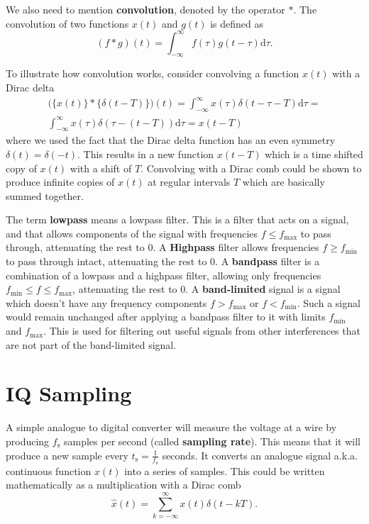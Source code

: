 \documentclass[a4paper,12pt,twoside,openright]{report}
\begin{document}
We also need to mention \textbf{convolution}, denoted by the operator $\ast$. The convolution of two functions $x(t)$ and $g(t)$ is defined as
$$(f \ast g)(t) = \int_{-\infty}^{\infty} f(\tau) g(t - \tau) \text{d} \tau .$$

To illustrate how convolution works, consider convolving a function $x(t)$ with a Dirac delta
\begin{multline}
\big( \{ x(t) \} \ast \{ \delta(t-T) \} \big)(t) =  \int_{-\infty}^{\infty} x(\tau) \delta(t - \tau - T ) \text{d} \tau = \\
\int_{-\infty}^{\infty} x(\tau) \delta( \tau - ( t -T) ) \text{d} \tau = x(t-T)
\end{multline}
where we used the fact that the Dirac delta function has an even symmetry $\delta(t) = \delta(-t)$. This results in a new function $x(t-T)$ which is a time shifted copy of $x(t)$ with a shift of $T$. Convolving with a Dirac comb could be shown to produce infinite copies of $x(t)$ at regular intervals $T$ which are basically summed together.

The term \textbf{lowpass} means a lowpass filter. This is a filter that acts on a signal, and that allows components of the signal with frequencies $f \leq f_\text{max}$ to pass through, attenuating the rest to 0. A \textbf{Highpass} filter allows frequencies $f \geq f_\text{min}$ to pass through intact, attenuating the rest to 0. A \textbf{bandpass} filter is a combination of a lowpass and a highpass filter, allowing only frequencies $f_\text{min} \leq f \leq f_\text{max}$, attenuating the rest to 0. A \textbf{band-limited} signal is a signal which doesn't have any frequency components $f > f_\text{max}$ or $f < f_\text{min}$. Such a signal would remain unchanged after applying a bandpass filter to it with limits $f_\text{min}$ and $f_\text{max}$. This is used for filtering out useful signals from other interferences that are not part of the band-limited signal.

\section{IQ Sampling} 
\label{sec:IQSampling}

A simple analogue to digital converter will measure the voltage at a wire by producing $f_\text{s}$ samples per second (called \textbf{sampling rate}). This means that it will produce a new sample every $t_\text{s} = \frac{1}{f_\text{s}}$ seconds. It converts an analogue signal a.k.a. continuous function $x(t)$ into a series of samples. This could be written mathematically as a multiplication with a Dirac comb
\begin{equation}
\label{eq:sampling}
\hat{x}(t) = \sum_{k=-\infty}^{\infty} x(t) \delta(t - kT) .
\end{equation}
\end{document}
